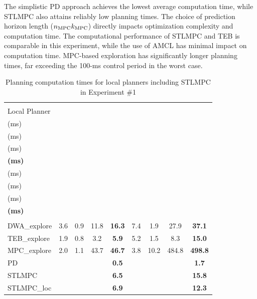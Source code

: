 \documentclass[journal]{IEEEtran}
\begin{document}
The simplistic PD approach achieves the lowest average computation time, while STLMPC also attains reliably low planning times. The choice of prediction horizon length ($n_\textup{MPC}k_\textup{MPC}$) directly impacts optimization complexity and computation time. The computational performance of STLMPC and TEB is comparable in this experiment, while the use of AMCL has minimal impact on computation time. MPC-based exploration has significantly longer planning times, far exceeding the 100-ms control period in the worst case.

\begin{table}[ht]
\caption{Planning computation times for local planners including STLMPC in Experiment \#1}
\label{tab:STLMPCcomp3}
\vspace{-8pt}
\centering
\begin{tabular}{
    l@{\hskip 3.4pt}c@{\hskip 4.0pt}c@{\hskip 4.0pt}c@{\hskip 5.5pt}c@{\hskip 3.2pt}c@{\hskip 3.2pt}c@{\hskip 3.2pt}c@{\hskip 3.2pt}c
}
\toprule\\[-1.2em]
\scriptsize Local Planner &
\makecell{\scriptsize$\bar{t}_\textup{frn}$\\(ms)} &
\makecell{\scriptsize$\bar{t}_\textup{glb}$\\(ms)} &
\makecell{\scriptsize$\bar{t}_\textup{loc}$\\(ms)} &
\makecell{\scriptsize\bm{$\bar{t}_\textbf{comp}$}\\\textbf{(ms)}} &
\makecell{\scriptsize$\max t_\textup{frn}$\\(ms)} &
\makecell{\scriptsize$\max t_\textup{glb}$\\(ms)} &
\makecell{\scriptsize$\max t_\textup{loc}$\\(ms)} &
\makecell{\scriptsize$\bm{\max t_\textbf{comp}}$\\\textbf{(ms)}} \\
\midrule\\[-1.2em] 
{\scriptsize DWA\_explore} & 3.6 & 0.9 & 11.8 & \textbf{16.3} & 7.4 & \phantom{0}1.9 & \phantom{0}27.9 & \phantom{0}\textbf{37.1}  \\
{\scriptsize TEB\_explore} & 1.9 & 0.8 & \phantom{0}3.2 & \phantom{0}\textbf{5.9} & 5.2 & \phantom{0}1.5 & \phantom{00}8.3 & \phantom{0}\textbf{15.0}  \\
{\scriptsize MPC\_explore} & 2.0 & 1.1 & 43.7 & \textbf{46.7} & 3.8 & 10.2 & 484.8 & \textbf{498.8}  \\
{\scriptsize PD} & \multicolumn{3}{c}{~~~} & \phantom{0}\textbf{0.5} & \multicolumn{3}{c}{~~~} & \phantom{00}\textbf{1.7}  \\
{\scriptsize STLMPC} & \multicolumn{3}{c}{~~~} & \phantom{0}\textbf{6.5} & \multicolumn{3}{c}{~~~} & \phantom{0}\textbf{15.8}  \\
{\scriptsize STLMPC\_loc} & \multicolumn{3}{c}{~~~} & \phantom{0}\textbf{6.9} & \multicolumn{3}{c}{~~~} & \phantom{0}\textbf{12.3}  \\
\bottomrule
\end{tabular}
\end{table}
\end{document}
